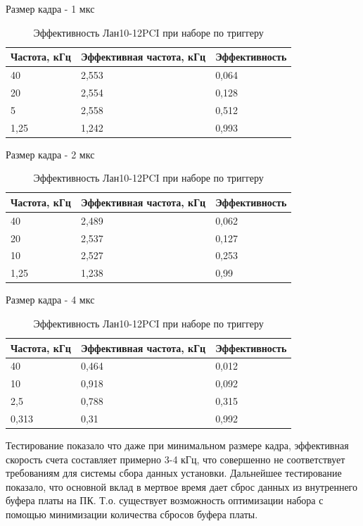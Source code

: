\documentclass[a4paper,14pt]{extreport}
\begin{document}
\begin{table}
\centering
    \caption*{Размер кадра - 1 мкс}
    \begin{tabular}{|l|l|l|}
        \hline
        Частота, кГц & Эффективная частота, кГц & Эффективность \\
        \hline
        40 & 2,553 & 0,064 \\
        \hline
        20 & 2,554 & 0,128 \\
        \hline
        5 & 2,558 & 0,512 \\
        \hline
        1,25 & 1,242 & 0,993 \\
        \hline
    \end{tabular} 

    \caption*{Размер кадра - 2 мкс}
    \begin{tabular}{|l|l|l|}
        \hline
        Частота, кГц & Эффективная частота, кГц & Эффективность \\
        \hline
        40 & 2,489 & 0,062 \\
        \hline
        20 & 2,537 & 0,127 \\
        \hline
        10 & 2,527 & 0,253 \\
        \hline
        1,25 & 1,238 & 0,99 \\
        \hline
    \end{tabular} 

    \caption*{Размер кадра - 4 мкс}
    \begin{tabular}{|l|l|l|}
        \hline
        Частота, кГц & Эффективная частота, кГц & Эффективность \\
        \hline
        40 & 0,464 & 0,012 \\
        \hline
        10 & 0,918 & 0,092 \\
        \hline
        2,5 & 0,788 & 0,315 \\
        \hline
        0,313 & 0,31 & 0,992 \\
        \hline
    \end{tabular}
    \caption{Эффективность Лан10-12PCI при наборе по триггеру}
    \label{tbl:lan-cr}
\end{table}

Тестирование показало что даже при минимальном размере кадра, эффективная скорость счета составляет примерно 3-4 кГц, что совершенно не соответствует требованиям для системы сбора данных установки. Дальнейшее тестирование показало, что основной вклад в мертвое время дает сброс данных из внутреннего буфера платы на ПК. Т.о. существует возможность оптимизации набора с помощью минимизации количества сбросов буфера платы.
\end{document}
